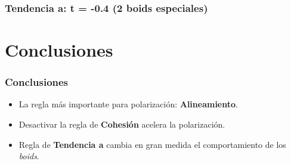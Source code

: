 \documentclass{beamer}
\begin{document}
        \begin{frame}[standout]
            \frametitle{Tendencia a: t = -0.4 (2 boids especiales)}
        \end{frame}
    \section{Conclusiones}
    \begin{frame}
        \frametitle{Conclusiones}
        \begin{itemize}
            \item La regla más importante para polarización: \textbf{Alineamiento}.
            \item Desactivar la regla de \textbf{Cohesión} acelera la polarización.
            \item Regla de \textbf{Tendencia a} cambia en gran medida el comportamiento de los \textit{boids}.
        \end{itemize}
    \end{frame}
    
\end{document}
